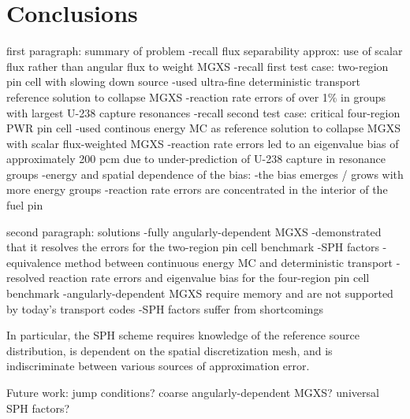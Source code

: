 \section{Conclusions}
\label{sec:conclusions}

first paragraph: summary of problem
-recall flux separability approx: use of scalar flux rather than angular flux to weight MGXS
-recall first test case: two-region pin cell with slowing down source
  -used ultra-fine deterministic transport reference solution to collapse MGXS
  -reaction rate errors of over 1\% in groups with largest U-238 capture resonances
-recall second test case: critical four-region PWR pin cell
  -used continous energy MC as reference solution to collapse MGXS with scalar flux-weighted MGXS
  -reaction rate errors led to an eigenvalue bias of approximately 200 pcm due to under-prediction of U-238 capture in resonance groups
-energy and spatial dependence of the bias:
  -the bias emerges / grows with more energy groups
  -reaction rate errors are concentrated in the interior of the fuel pin

second paragraph: solutions
-fully angularly-dependent MGXS
  -demonstrated that it resolves the errors for the two-region pin cell benchmark
-SPH factors
  -equivalence method between continuous energy MC and deterministic transport
  -resolved reaction rate errors and eigenvalue bias for the four-region pin cell benchmark
-angularly-dependent MGXS require memory and are not supported by today's transport codes
-SPH factors suffer from shortcomings

In particular, the SPH scheme requires knowledge of the reference source distribution, is dependent on the spatial discretization mesh, and is indiscriminate between various sources of approximation error.

{\color{red} Future work: jump conditions? coarse angularly-dependent MGXS? universal SPH factors?}

